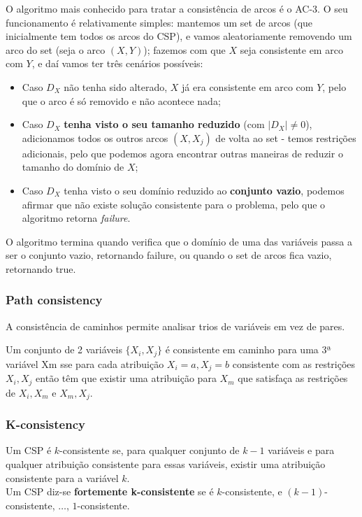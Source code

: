 \documentclass[11pt]{article}
\begin{document}
O algoritmo mais conhecido para tratar a consistência de arcos é o AC-3. O seu funcionamento é relativamente simples: mantemos um set de arcos (que inicialmente tem todos os arcos do CSP), e vamos aleatoriamente removendo um arco do set (seja o arco $(X,Y)$); fazemos com que $X$ seja consistente em arco com $Y$, e daí vamos ter três cenários possíveis:
\begin{itemize}
    \item Caso $D_X$ não tenha sido alterado, $X$ já era consistente em arco com $Y$, pelo que o arco é só removido e não acontece nada;
    \item Caso $D_X$ \textbf{tenha visto o seu tamanho reduzido} (com $\left\lvert D_X\right\rvert\neq 0$), adicionamos todos os outros arcos $(X,X_j)$ de volta ao set - temos restrições adicionais, pelo que podemos agora encontrar outras maneiras de reduzir o tamanho do domínio de $X$;
    \item Caso $D_X$ tenha visto o seu domínio reduzido ao \textbf{conjunto vazio}, podemos afirmar que não existe solução consistente para o problema, pelo que o algoritmo retorna \textit{failure}.
\end{itemize}
O algoritmo termina quando verifica que o domínio de uma das variáveis passa a ser o conjunto vazio, retornando failure, ou quando o set de arcos fica vazio, retornando true.

\subsubsection{Path consistency}

A consistência de caminhos permite analisar trios de variáveis em vez de pares.\vspace{4pt}

Um conjunto de 2 variáveis $\{X_i, X_j\}$ é consistente em caminho para uma 3ª variável Xm sse para cada atribuição ${X_i = a, X_j = b}$ consistente com as restrições ${X_i, X_j}$ então têm que existir uma atribuição para $X_m$ que satisfaça as restrições de ${X_i, X_m}$ e ${X_m, X_j}$.

\subsubsection{K-consistency}

Um CSP é $k$-consistente se, para qualquer conjunto de $k-1$ variáveis e para qualquer atribuição consistente para essas variáveis, existir uma atribuição consistente para a variável $k$.\\
Um CSP diz-se \textbf{fortemente k-consistente} se é $k$-consistente, e $(k-1)$-consistente, $\ldots$, $1$-consistente.
\end{document}
